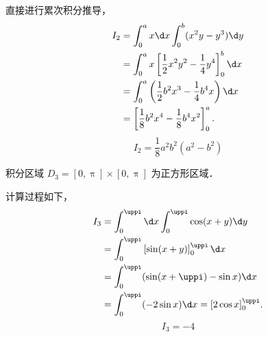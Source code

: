 \begin{solution}
    直接进行累次积分推导，
    \begin{equation}
        \begin{aligned}
            I_2 & = \int_{0}^{a} x \d x \int_{0}^{b} (x^2 y - y^3) \d y                          \\
                & = \int_{0}^{a} x \left[ \frac{1}{2} x^2 y^2 - \frac{1}{4} y^4 \right]_0^b \d x \\
                & = \int_{0}^{a} \left( \frac{1}{2} b^2 x^3 - \frac{1}{4} b^4 x \right) \d x     \\
                & = \left[ \frac{1}{8} b^2 x^4 - \frac{1}{8} b^4 x^2 \right]_0^a.
        \end{aligned}
    \end{equation}
    \begin{equation}
        I_2 = \boxed{\frac{1}{8} a^2 b^2 (a^2 - b^2)}
    \end{equation}

     积分区域 $D_3 = [0, \uppi] \times [0, \uppi]$ 为正方形区域．

    \begin{center}
    \end{center}

    计算过程如下，
    \begin{equation}
        \begin{aligned}
            I_3 & = \int_{0}^{\uppi} \d x \int_{0}^{\uppi} \cos(x + y) \d y    \\
                & = \int_{0}^{\uppi} \left[ \sin(x + y) \right]_0^{\uppi} \d x \\
                & = \int_{0}^{\uppi} (\sin(x + \uppi) - \sin x) \d x           \\
                & = \int_{0}^{\uppi} (-2 \sin x) \d x = [2 \cos x]_0^{\uppi}.
        \end{aligned}
    \end{equation}
    \begin{equation}
        I_3 = \boxed{-4}
    \end{equation}


\end{solution}
